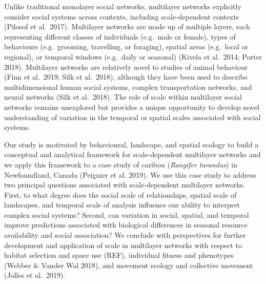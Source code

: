 \documentclass[]{article}
\begin{document}
Unlike traditional monolayer social networks, multilayer networks explicitly
consider social systems across contexts, including scale-dependent contexts
(Pilosof et al.~2017). Multilayer networks are made up of multiple layers, each
representing different classes of individuals (e.g.~male or female), types of
behaviours (e.g.~grooming, travelling, or foraging), spatial areas (e.g.~local
or regional), or temporal windows (e.g.~daily or seasonal) (Kivela et al.~2014;
Porter 2018). Multilayer networks are relatively novel to studies of animal
behaviour (Finn et al.~2019; Silk et al.~2018), although they have been used to
describe multidimensional human social systems, complex transportation networks,
and neural networks (Silk et al.~2018). The role of scale within multilayer
social networks remains unexplored but provides a unique opportunity to develop
novel understanding of variation in the temporal or spatial scales associated
with social systems.

Our study is motivated by behavioural, landscape, and spatial ecology to build a
conceptual and analytical framework for scale-dependent multilayer networks and
we apply this framework to a case study of caribou (\emph{Rangifer tarandus}) in
Newfoundland, Canada (Peignier et al. 2019). We use this case study to address two
principal questions associated with scale-dependent multilayer networks. First,
to what degree does the social scale of relationships, spatial scale of
landscapes, and temporal scale of analysis influence our ability to interpret
complex social systems? Second, can variation in social, spatial, and temporal
improve predictions associated with biological differences in seasonal resource
availability and social association? We conclude with perspectives for further
development and application of scale in multilayer networks with respect to
habitat selection and space use (REF), individual fitness and
phenotypes (Webber \& Vander Wal 2018), and movement ecology and collective
movement (Jolles et al.~2019).
\end{document}
